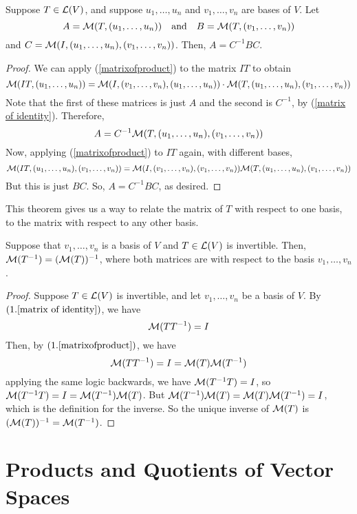 \begin{theorem}
    Suppose $T\in\mathcal{L}(V)$, and suppose $u_1, \dots, u_n$ and $v_1, \dots, v_n$ are bases of $V$. Let 
    \[ A = \mathcal{M}(T, (u_1, \dots, u_n))\quad\text{and}\quad B = \mathcal{M}(T, (v_1, \dots, v_n)) \]
    and $C = \mathcal{M}(I, (u_1, \dots, u_n), (v_1, \dots, v_n))$. Then, $A = C^{-1}BC$.
\end{theorem}
\begin{proof}
    We can apply (\ref{matrixofproduct}) to the matrix $IT$ to obtain
    \[ \mathcal{M}(IT, (u_1, \dots, u_n)) = \mathcal{M}(I, (v_1, \dots, v_n), (u_1, \dots, u_n)) \cdot \mathcal{M}(T, (u_1, \dots, u_n), (v_1, \dots, v_n))\]
    Note that the first of these matrices is just $A$ and the second is $C^{-1}$, by (\ref{matrix of identity}). Therefore,
    \[ A = C^{-1}\mathcal{M}(T, (u_1, \dots, u_n), (v_1, \dots, v_n)) \]
    Now, applying (\ref{matrixofproduct}) to $IT$ again, with different bases,
    \[ \mathcal{M}(IT, (u_1, \dots, u_n), (v_1, \dots, v_n)) = \mathcal{M}(I, (v_1, \dots, v_n), (v_1, \dots, v_n)) \mathcal{M}(T, (u_1, \dots, u_n), (v_1, \dots, v_n))\]
    But this is just $BC$. So, $A = C^{-1}BC$, as desired.
\end{proof}
This theorem gives us a way to relate the matrix of $T$ with respect to one basis, to the matrix with respect to any other basis.
\begin{theorem}
    Suppose that $v_1, \dots, v_n$ is a basis of $V$ and $T\in\mathcal{L}(V)$ is invertible. Then, $\mathcal{M}(T^{-1}) = (\mathcal{M}(T))^{-1}$, where both matrices are with respect to the basis $v_1, \dots, v_n$.
\end{theorem}
\begin{proof}
    Suppose $T\in\mathcal{L}(V)$ is invertible, and let $v_1, \dots, v_n$ be a basis of $V$. By $(1.\ref{matrix of identity})$, we have
    \[ \mathcal{M}(TT^{-1}) = I\]
    Then, by $(1.\ref{matrixofproduct})$, we have
    \[ \mathcal{M}(TT^{-1}) = I = \mathcal{M}(T)\mathcal{M}(T^{-1})\]
    applying the same logic backwards, we have $\mathcal{M}(T^{-1}T) = I$, so $\mathcal{M}(T^{-1}T) = I = \mathcal{M}(T^{-1})\mathcal{M}(T)$. But $\mathcal{M}(T^{-1})\mathcal{M}(T) = \mathcal{M}(T)\mathcal{M}(T^{-1}) = I$, which is the definition for the inverse. So the unique inverse of $\mathcal{M}(T)$ is $(\mathcal{M}(T))^{-1} = \mathcal{M}(T^{-1})$.
\end{proof}
\section{Products and Quotients of Vector Spaces}
